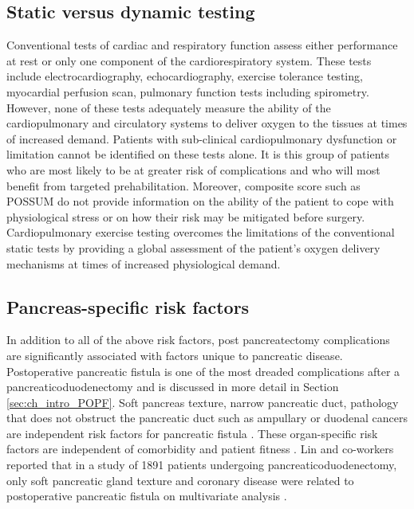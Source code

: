\subsection{Static versus dynamic testing}

Conventional tests of cardiac and respiratory function assess either performance at rest or only one component of the cardiorespiratory system. 
These tests include electrocardiography, echocardiography, exercise tolerance testing, myocardial perfusion scan, pulmonary function tests including spirometry. 
However, none of these tests adequately measure the ability of the cardiopulmonary and circulatory systems to deliver oxygen to the tissues at times of increased demand. 
Patients with sub-clinical cardiopulmonary dysfunction or limitation cannot be identified on these tests alone. 
It is this group of patients who are most likely to be at greater risk of complications and who will most benefit from targeted prehabilitation. 
Moreover, composite score such as POSSUM do not provide information on the ability of the patient to cope with physiological stress or on how their risk may be mitigated before surgery.
Cardiopulmonary exercise testing overcomes the limitations of the conventional static tests by providing a global assessment of the patient's oxygen delivery mechanisms at times of increased physiological demand.

\subsection{Pancreas-specific risk factors}
In addition to all of the above risk factors, post pancreatectomy complications are significantly associated with factors unique to pancreatic disease.
Postoperative pancreatic fistula is one of the most dreaded complications after a pancreaticoduodenectomy and is discussed in more detail in Section \ref{sec:ch_intro_POPF}.
Soft pancreas texture, narrow pancreatic duct, pathology that does not obstruct the pancreatic duct such as ampullary or duodenal cancers are independent risk factors for pancreatic fistula \parencite{pratt_risk_2008}.
These organ-specific risk factors are independent of comorbidity and patient fitness \parencite{deoliveira_assessment_2006}.
Lin and co-workers reported that in a study of 1891 patients undergoing pancreaticoduodenectomy, only soft pancreatic gland texture and coronary disease were related to postoperative pancreatic fistula on multivariate analysis \parencite{lin_risk_2004}.

